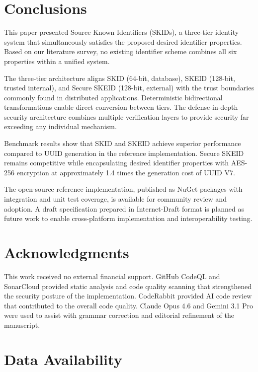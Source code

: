 \documentclass[fleqn,10pt,lineno]{wlpeerj}
\begin{document}
\section{Conclusions}\label{conclusions}

This paper presented Source Known Identifiers (SKIDs), a three-tier
identity system that simultaneously satisfies the proposed desired
identifier properties. Based on our literature survey, no existing
identifier scheme combines all six properties within a unified system.

The three-tier architecture aligns SKID (64-bit, database), SKEID
(128-bit, trusted internal), and Secure SKEID (128-bit, external) with
the trust boundaries commonly found in distributed applications.
Deterministic bidirectional transformations enable direct conversion
between tiers. The defense-in-depth security architecture combines
multiple verification layers to provide security far exceeding any
individual mechanism.

Benchmark results show that SKID and SKEID achieve superior performance
compared to UUID generation in the reference implementation. Secure
SKEID remains competitive while encapsulating desired identifier
properties with AES-256 encryption at approximately 1.4 times the
generation cost of UUID V7.

The open-source reference implementation, published as NuGet packages
with integration and unit test coverage, is available for community
review and adoption. A draft specification prepared in Internet-Draft
format is planned as future work to enable cross-platform implementation
and interoperability testing.

\section{Acknowledgments}\label{acknowledgments}

This work received no external financial support. GitHub CodeQL and
SonarCloud provided static analysis and code quality scanning that
strengthened the security posture of the implementation. CodeRabbit
provided AI code review that contributed to the overall code quality.
Claude Opus 4.6 and Gemini 3.1 Pro were used to assist with grammar
correction and editorial refinement of the manuscript.

\section{Data Availability}\label{data-availability}
\end{document}
